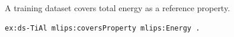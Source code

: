 A training dataset covers total energy as a reference property.
\begin{lstlisting}[language=turtle]
ex:ds-TiAl mlips:coversProperty mlips:Energy .
\end{lstlisting}
